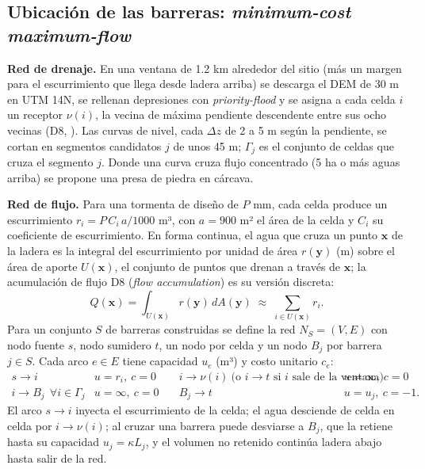 \subsection{Ubicación de las barreras: \emph{minimum-cost maximum-flow}}\label{sec:mcmf}

\textbf{Red de drenaje.} En una ventana de 1.2 km alrededor del sitio (más un margen para el escurrimiento que llega desde ladera arriba) se descarga el DEM de 30 m en UTM 14N, se rellenan depresiones con \emph{priority-flood}  y se asigna a cada celda $i$ un receptor $\nu(i)$, la vecina de máxima pendiente descendente entre sus ocho vecinas (D8, ). Las curvas de nivel, cada $\Delta z$ de 2 a 5 m según la pendiente, se cortan en segmentos candidatos $j$ de unos 45 m; $\Gamma_j$ es el conjunto de celdas que cruza el segmento $j$. Donde una curva cruza flujo concentrado (5 ha o más aguas arriba) se propone una presa de piedra en cárcava.

\textbf{Red de flujo.} Para una tormenta de diseño de $P$ mm, cada celda produce un escurrimiento $r_i = P\,C_i\,a/1000$ m³, con $a = 900$ m² el área de la celda y $C_i$ su coeficiente de escurrimiento. En forma continua, el agua que cruza un punto $\mathbf x$ de la ladera es la integral del escurrimiento por unidad de área $r(\mathbf y)$ (m) sobre el área de aporte $U(\mathbf x)$, el conjunto de puntos que drenan a través de $\mathbf x$; la acumulación de flujo D8 (\emph{flow accumulation}) es su versión discreta:
\begin{equation}
Q(\mathbf x)=\int_{U(\mathbf x)} r(\mathbf y)\,dA(\mathbf y)\;\approx\;\sum_{i\in U(\mathbf x)} r_i .
\end{equation}
Para un conjunto $S$ de barreras construidas se define la red $N_S=(V,E)$ con nodo fuente $s$, nodo sumidero $t$, un nodo por celda y un nodo $B_j$ por barrera $j\in S$. Cada arco $e\in E$ tiene capacidad $u_e$ (m³) y costo unitario $c_e$:
\begin{equation}
\begin{array}{llll}
s\to i & u=r_i,\ c=0 & \quad i\to\nu(i)\ \text{(o } i\to t\text{ si } i \text{ sale de la ventana)} & u=\infty,\ c=0\\[2pt]
i\to B_j\ \ \forall i\in\Gamma_j & u=\infty,\ c=0 & \quad B_j\to t & u=u_j,\ c=-1 .
\end{array}
\end{equation}
El arco $s\to i$ inyecta el escurrimiento de la celda; el agua desciende de celda en celda por $i\to\nu(i)$; al cruzar una barrera puede desviarse a $B_j$, que la retiene hasta su capacidad $u_j=\kappa L_j$, y el volumen no retenido continúa ladera abajo hasta salir de la red.

